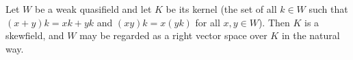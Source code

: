 Let $W$ be a weak quasifield and let $K$ be its kernel (the set of all $k \in W$ such that $(x+y)k = xk + yk$ and $(xy)k = x(yk)$ for all $x,y \in W$). Then $K$ is a skewfield, and $W$ may be regarded as a right vector space over $K$ in the natural way.
